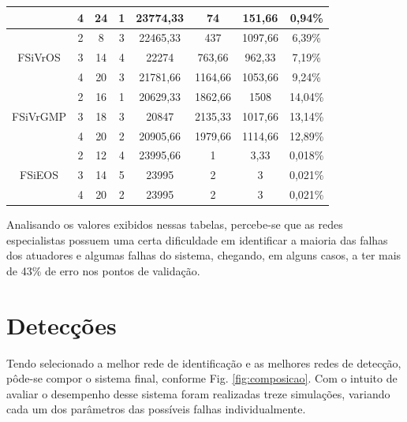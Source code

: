 \begin{table}[!htb]
\begin{tabular}{|c|c|c|c|c|c|c|c|}
\hhline{~-------}
& 
\cellcolor[gray]{0.85}4 & 
\cellcolor[gray]{0.85}24 & 
\cellcolor[gray]{0.85}1 & 
\cellcolor[gray]{0.85}23774,33 & 
\cellcolor[gray]{0.85}74 & 
\cellcolor[gray]{0.85}151,66 & 
\cellcolor[gray]{0.85}0,94\%\\
\hline
\multirow{3}{*}{FSiVrOS} &
\cellcolor[gray]{0.85}2 & 
\cellcolor[gray]{0.85}8 & 
\cellcolor[gray]{0.85}3 & 
\cellcolor[gray]{0.85}22465,33 & 
\cellcolor[gray]{0.85}437 & 
\cellcolor[gray]{0.85}1097,66 & 
\cellcolor[gray]{0.85}6,39\%\\
\hhline{~-------}
& 3 & 14 & 4 & 22274 & 763,66 & 962,33 & 7,19\%\\
\cline{2-8}
& 4 & 20 & 3 & 21781,66 & 1164,66 & 1053,66 & 9,24\%\\
\hline
\multirow{3}{*}{FSiVrGMP} &
2 & 16 & 1 & 20629,33 & 1862,66 & 1508 & 14,04\%\\
\cline{2-8}
& 3 & 18 & 3 & 20847 & 2135,33 & 1017,66 & 13,14\%\\
\hhline{~-------}
& 
\cellcolor[gray]{0.85}4 & 
\cellcolor[gray]{0.85}20 & 
\cellcolor[gray]{0.85}2 & 
\cellcolor[gray]{0.85}20905,66 & 
\cellcolor[gray]{0.85}1979,66 & 
\cellcolor[gray]{0.85}1114,66 & 
\cellcolor[gray]{0.85}12,89\%\\
\hline
\multirow{3}{*}{FSiEOS} &
\cellcolor[gray]{0.85}2 & 
\cellcolor[gray]{0.85}12 & 
\cellcolor[gray]{0.85}4 & 
\cellcolor[gray]{0.85}23995,66 & 
\cellcolor[gray]{0.85}1 & 
\cellcolor[gray]{0.85}3,33 & 
\cellcolor[gray]{0.85}0,018\%\\
\hhline{~-------}
& 3 & 14 & 5 & 23995 & 2 & 3 & 0,021\%\\
\cline{2-8}
& 4 & 20 & 2 & 23995 & 2 & 3 & 0,021\%\\
\hline
\end{tabular}
\end{table}

Analisando os valores exibidos nessas tabelas, percebe-se que as redes
especialistas possuem uma certa dificuldade em identificar a maioria das falhas
dos atuadores e algumas falhas do sistema, chegando, em alguns casos, a ter mais
de 43\% de erro nos pontos de validação. %

\section{Detecções}
Tendo selecionado a melhor rede de identificação e as melhores redes de
detecção, pôde-se compor o sistema final, conforme Fig. \ref{fig:composicao}.
Com o intuito de avaliar o desempenho desse sistema foram realizadas treze
simulações, variando cada um dos parâmetros das possíveis falhas
individualmente.

